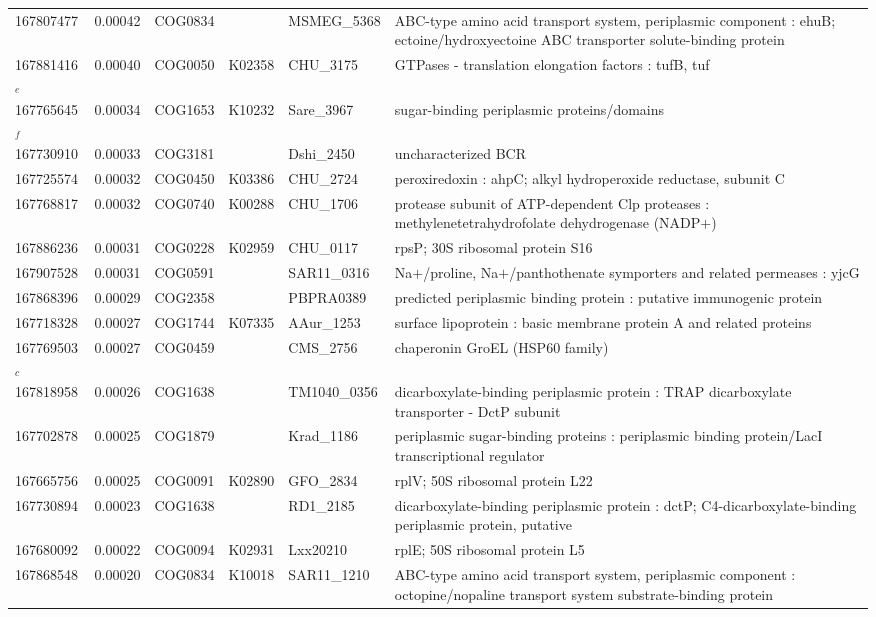 \begin{landscape}
\begin{longtable}{p{1.6cm}p{1.2cm}p{1.5cm}p{1.5cm}p{2.8cm}p{13.5cm}}
167807477 & 0.00042 & COG0834 &  & MSMEG\_5368 & ABC-type amino acid transport system,  periplasmic component : ehuB; ectoine/hydroxyectoine ABC transporter solute-binding protein \\
167881416$_e$ & 0.00040 & COG0050 & K02358 & CHU\_3175 & GTPases - translation elongation factors : tufB,  tuf \\
167765645$_f$ & 0.00034 & COG1653 & K10232 & Sare\_3967 & sugar-binding periplasmic proteins/domains \\
167730910 & 0.00033 & COG3181 &  & Dshi\_2450 & uncharacterized BCR \\
167725574 & 0.00032 & COG0450 & K03386 & CHU\_2724 & peroxiredoxin : ahpC; alkyl hydroperoxide reductase,  subunit C \\
167768817 & 0.00032 & COG0740 & K00288 & CHU\_1706 & protease subunit of ATP-dependent Clp proteases : methylenetetrahydrofolate dehydrogenase (NADP$+$) \\
167886236 & 0.00031 & COG0228 & K02959 & CHU\_0117 & rpsP; 30S ribosomal protein S16 \\
167907528 & 0.00031 & COG0591 &  & SAR11\_0316 & Na$+$/proline,  Na$+$/panthothenate symporters and related permeases : yjcG \\
167868396 & 0.00029 & COG2358 &  & PBPRA0389 & predicted periplasmic binding protein : putative immunogenic protein \\
167718328 & 0.00027 & COG1744 & K07335 & AAur\_1253 & surface lipoprotein : basic membrane protein A and related proteins \\
167769503$_c$ & 0.00027 & COG0459 &  & CMS\_2756 & chaperonin GroEL (HSP60 family) \\
167818958 & 0.00026 & COG1638 &  & TM1040\_0356 & dicarboxylate-binding periplasmic protein : TRAP dicarboxylate transporter - DctP subunit \\
167702878 & 0.00025 & COG1879 &  & Krad\_1186 & periplasmic sugar-binding proteins : periplasmic binding protein/LacI transcriptional regulator \\
167665756 & 0.00025 & COG0091 & K02890 & GFO\_2834 & rplV; 50S ribosomal protein L22 \\
167730894 & 0.00023 & COG1638 &  & RD1\_2185 & dicarboxylate-binding periplasmic protein : dctP; C4-dicarboxylate-binding periplasmic protein,  putative \\
167680092 & 0.00022 & COG0094 & K02931 & Lxx20210 & rplE; 50S ribosomal protein L5 \\
167868548 & 0.00020 & COG0834 & K10018 & SAR11\_1210 & ABC-type amino acid transport system,  periplasmic component : octopine/nopaline transport system substrate-binding protein \\

\end{longtable}
\end{landscape}
